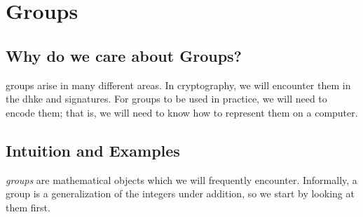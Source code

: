 \section{Groups}
\label{sec:math_groups}

\subsection{Why do we care about Groups?}
\Glspl{group} arise in many different areas.
In cryptography, we will encounter them in the \gls{dhke}
and \glspl{signature}.
For \glspl{group} to be used in practice, we will need to encode them;
that is, we will need to know how to represent them on a computer.

\subsection{Intuition and Examples}
\emph{\Glspl{group}} are mathematical objects which we will
frequently encounter.
Informally, a \gls{group} is a generalization of the integers under addition,
so we start by looking at them first.

